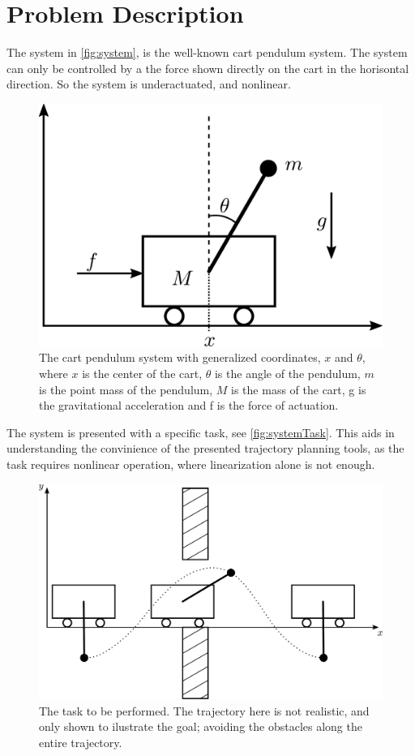 \section{Problem Description}\label{sec:problemDescription}
The system in \autoref{fig:system}, is the well-known cart pendulum system. The system can only be controlled by a the force shown directly on the cart in the horisontal direction. So the system is underactuated, and nonlinear.

\begin{figure}[H]
  \includegraphics[width=.4\textwidth]{figures/system}
  \caption{The cart pendulum system with generalized coordinates, $x$ and $\theta$, where $x$ is the center of the cart, $\theta$ is the angle of the pendulum, $m$ is the point mass of the pendulum, $M$ is the mass of the cart, g is the gravitational acceleration and f is the force of actuation.}
  \label{fig:system}
\end{figure}

The system is presented with a specific task, see \autoref{fig:systemTask}. This aids in understanding the convinience of the presented trajectory planning tools, as the task requires nonlinear operation, where linearization alone is not enough.

\begin{figure}[H]
  \includegraphics[width=.6\textwidth]{figures/systemTask}
  \caption{The task to be performed. The trajectory here is not realistic, and only shown to ilustrate the goal; avoiding the obstacles along the entire trajectory.}
  \label{fig:systemTask}
\end{figure}

